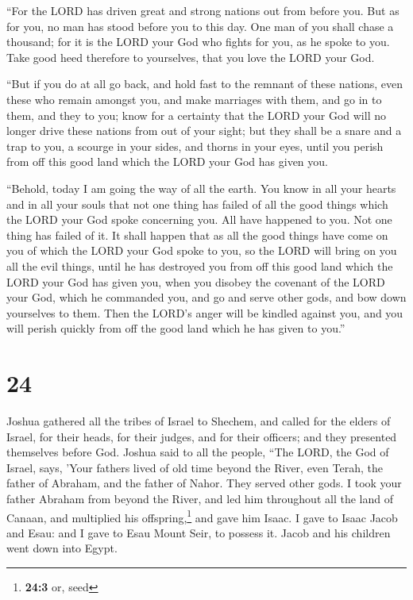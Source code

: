  ``For the LORD has driven great and strong nations out
from before you. But as for you, no man has stood before you to this
day.  One man of you shall chase a thousand; for it is
the LORD your God who fights for you, as he spoke to you.
 Take good heed therefore to yourselves, that you love
the LORD your God.

 ``But if you do at all go back, and hold fast to the
remnant of these nations, even these who remain amongst you, and make
marriages with them, and go in to them, and they to you; 
know for a certainty that the LORD your God will no longer drive these
nations from out of your sight; but they shall be a snare and a trap to
you, a scourge in your sides, and thorns in your eyes, until you perish
from off this good land which the LORD your God has given you.

 ``Behold, today I am going the way of all the earth. You
know in all your hearts and in all your souls that not one thing has
failed of all the good things which the LORD your God spoke concerning
you. All have happened to you. Not one thing has failed of it.
 It shall happen that as all the good things have come on
you of which the LORD your God spoke to you, so the LORD will bring on
you all the evil things, until he has destroyed you from off this good
land which the LORD your God has given you,  when you
disobey the covenant of the LORD your God, which he commanded you, and
go and serve other gods, and bow down yourselves to them. Then the
LORD's anger will be kindled against you, and you will perish quickly
from off the good land which he has given to you.''

\hypertarget{section-23}{%
\section{24}\label{section-23}}

 Joshua gathered all the tribes of Israel to Shechem, and
called for the elders of Israel, for their heads, for their judges, and
for their officers; and they presented themselves before God.
 Joshua said to all the people, ``The LORD, the God of
Israel, says, 'Your fathers lived of old time beyond the River, even
Terah, the father of Abraham, and the father of Nahor. They served other
gods.  I took your father Abraham from beyond the River,
and led him throughout all the land of Canaan, and multiplied his
offspring,\footnote{\textbf{24:3} or, seed} and gave him Isaac.
 I gave to Isaac Jacob and Esau: and I gave to Esau Mount
Seir, to possess it. Jacob and his children went down into Egypt.

